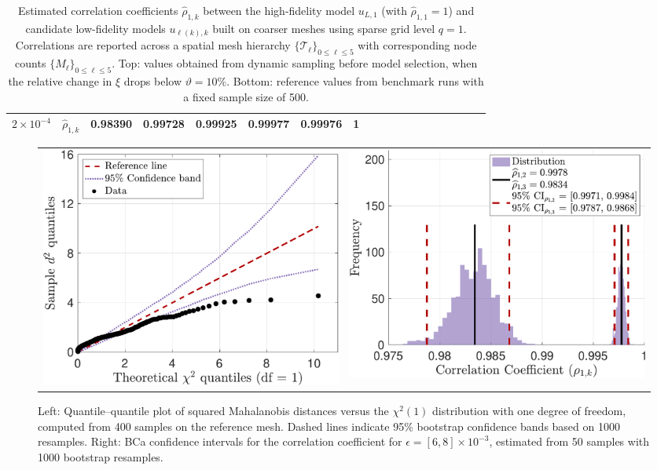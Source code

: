 \begin{table}[ht]
{\begin{tabular}{|c|c|c|c|c|c|c|c|c|c|c|c|c|c|c|c|c|c|c|}
\multirow{1}{*}{$2\times 10^{-4}$}&\multicolumn{1}{|c|}{$\widehat \rho_{1,k}$}&0.98390   &0.99728   &0.99925   &0.99977   &0.99976   &1\\
\hline
\end{tabular}}
\caption{Estimated correlation coefficients $\widehat{\rho}_{1,k}$ between the high-fidelity model $u_{L,1}$ (with $\widehat{\rho}_{1,1} = 1$) and candidate low-fidelity models $u_{\ell(k),k}$ built on coarser meshes using sparse grid level $q = 1$. Correlations are reported across a spatial mesh hierarchy $\{\mathcal{T}_\ell\}_{0 \le \ell \le 5}$ with corresponding node counts $\{M_\ell\}_{0 \le \ell \le 5}$. Top: values obtained from dynamic sampling before model selection, when the relative change in $\xi$ drops below $\vartheta = 10\%$. Bottom: reference values from benchmark runs with a fixed sample size of 500.}
\label{Tab:MFMC_parameters}
\end{table}
%







%
\begin{figure}[ht!]\centering
\begin{tabular}{cc}
\includegraphics[height=0.36\linewidth]{./figures/test_normal.pdf}&
\includegraphics[height=0.36\linewidth]{./figures/CI_BCa_8e3.pdf}
\end{tabular}
\caption{Left: Quantile–quantile plot of squared Mahalanobis distances versus the $\chi^2(1)$ distribution with one degree of freedom, computed from 400 samples on the reference mesh. Dashed lines indicate 95\% bootstrap confidence bands based on 1000 resamples. Right: BCa confidence intervals for the correlation coefficient for $\epsilon=[6,8]\times 10^{-3}$, estimated from 50 samples with 1000 bootstrap resamples.}
\label{fig:Test_normal}
\end{figure}
%


